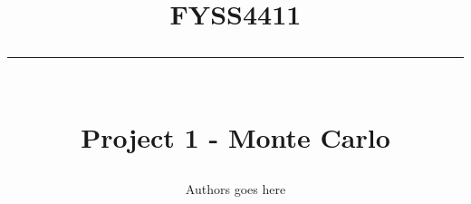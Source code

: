 \newcommand{\horrule}[1]{\rule{\linewidth}{#1}} %

\title{
\large \textsc{FYSS4411} \\ [25pt]
\horrule{0.5pt} \\[0.4cm]
\huge Project 1 - Monte Carlo}

\author{Authors goes here}

